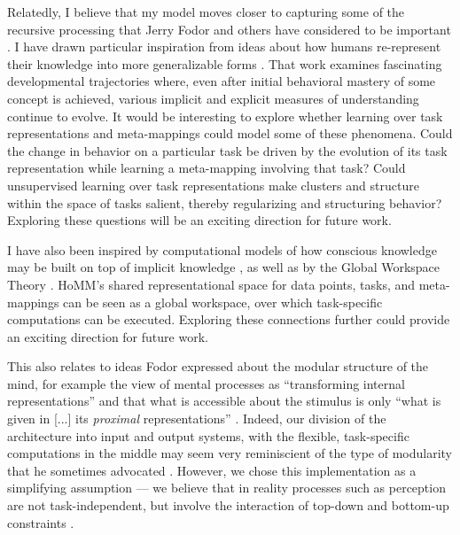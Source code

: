 Relatedly, I believe that my model moves closer to capturing some of the recursive processing that Jerry Fodor and others have considered to be important \citep[e.g.][]{Fodor2008lot2}. I have drawn particular inspiration from ideas about how humans re-represent their knowledge into more generalizable forms \citep{Karmiloff-Smith1986,Clark1993}. That work examines fascinating developmental trajectories where, even after initial behavioral mastery of some concept is achieved, various implicit and explicit measures of understanding continue to evolve. It would be interesting to explore whether learning over task representations and meta-mappings could model some of these phenomena. Could the change in behavior on a particular task be driven by the evolution of its task representation while learning a meta-mapping involving that task? Could unsupervised learning over task representations make clusters and structure within the space of tasks salient, thereby regularizing and structuring behavior? Exploring these questions will be an exciting direction for future work. \par 

I have also been inspired by computational models of how conscious knowledge may be built on top of implicit knowledge \citep{Cleeremans2014}, as well as by the Global Workspace Theory \citep{Baars2005}. HoMM's shared representational space for data points, tasks, and meta-mappings can be seen as a global workspace, over which task-specific computations can be executed. Exploring these connections further could provide an exciting direction for future work. \par

This also relates to ideas Fodor expressed about the modular structure of the mind, for example the view of mental processes as ``transforming internal representations'' and that what is accessible about the stimulus is only ``what is given in [...] its \emph{proximal} representations'' \citep[][pp. 200-201]{fodor1975language}. Indeed, our division of the architecture into input and output systems, with the flexible, task-specific computations in the middle may seem very reminiscient of the type of modularity that he sometimes advocated \citep{Fodor1983modularity}. However, we chose this implementation as a simplifying assumption --- we believe that in reality processes such as perception are not task-independent, but involve the interaction of top-down and bottom-up constraints \citep{McClelland2014}. \par

